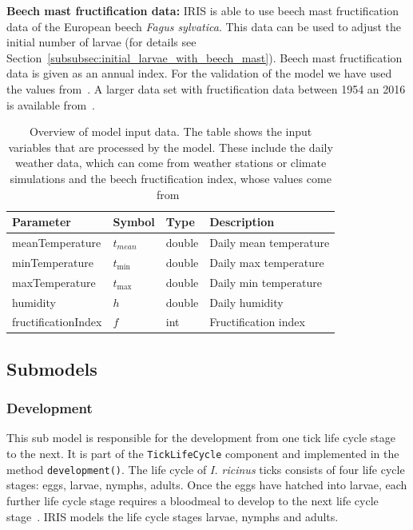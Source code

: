 \documentclass[a4paper, 11pt]{scrartcl}
\newcommand{\inlinecode}[1]{\texttt{\small #1}}
\begin{document}

\textbf{Beech mast fructification data:} IRIS is able to use beech mast fructification data of the European beech \textit{Fagus sylvatica}. This data can be used to adjust the initial number of larvae (for details see Section~\ref{subsubsec:initial_larvae_with_beech_mast}). Beech mast fructification data is given as an annual index. For the validation of the model we have used the values from~\textcite{Brugger.2018}. A larger data set with fructification data between 1954 an 2016 is available from~\textcite{Konnert.2016}.


\begin{table}[h!]
\caption[Overview of model input data.]{Overview of model input data. The table shows the input variables that are processed by the model. These include the daily weather data, which can come from weather stations or climate simulations and the beech fructification index, whose values come from~\textcite{Konnert.2016}}
\label{tab:input_parameters}
\begin{tabularx}{\textwidth}{llll}
\toprule
\textbf{Parameter} & \textbf{Symbol} & \textbf{Type}     & \textbf{Description}       \\
\midrule
meanTemperature    & $t_{mean}$      & double            & Daily mean temperature     \\
minTemperature     & $t_{\min}$      & double            & Daily max temperature      \\
maxTemperature     & $t_{\max}$      & double            & Daily min temperature      \\
humidity           & $h$             & double            & Daily humidity             \\
\midrule
fructificationIndex & $f$            & int               & Fructification index		  \\
\bottomrule
\end{tabularx}
\end{table}


\newpage
\subsection{Submodels}\label{submodels}

\subsubsection{Development}
This sub model is responsible for the development from one tick life cycle stage to the next. It is part of the \inlinecode{TickLifeCycle} component and implemented in the method \inlinecode{development()}. The life cycle of \textit{I. ricinus} ticks consists of four life cycle stages: eggs, larvae, nymphs, adults. Once the eggs have hatched into larvae, each further life cycle stage requires a bloodmeal to develop to the next life cycle stage~\parencite{tba}. IRIS models the life cycle stages larvae, nymphs and adults.
\end{document}
